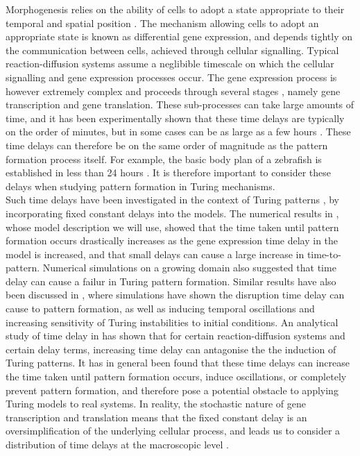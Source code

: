 \documentclass[12pt,a4paper]{report}
\begin{document}
Morphogenesis relies on the ability of cells to adopt a state appropriate to their temporal and spatial position \cite{gaffmonk}. The mechanism allowing cells to adopt an appropriate state is known as differential gene expression, and depends tightly on the communication between cells, achieved through cellular signalling. Typical reaction-diffusion systems assume a neglibible timescale on which the cellular signalling and gene expression processes occur. The gene expression process is however extremely complex and proceeds through several stages \cite{gaffmonk}, namely gene transcription and gene translation. These sub-processes can take large amounts of time, and it has been experimentally shown that these time delays are typically on the order of minutes, but in some cases can be as large as a few hours \cite{gaffmonk,tennyson}. These time delays can therefore be on the same order of magnitude as the pattern formation process itself. For example, the basic body plan of a zebrafish is established in less than 24 hours \cite{gaffmonk,kimmel}. It is therefore important to consider these delays when studying pattern formation in Turing mechanisms.
\\
Such time delays have been investigated in the context of Turing patterns \cite{gaffmonk,leegaffney,yigaffneyli,jiang,leegaffmonk,bratsun,william}, by incorporating fixed constant delays into the models. The numerical results in \cite{gaffmonk}, whose model description we will use, showed that the time taken until pattern formation occurs drastically increases as the gene expression time delay in the model is increased, and that small delays can cause a large increase in time-to-pattern. Numerical simulations on a growing domain also suggested that time delay can cause a failur in Turing pattern formation. Similar results have also been discussed in \cite{leegaffney,leegaffmonk}, where simulations have shown the disruption time delay can cause to pattern formation, as well as inducing temporal oscillations and increasing sensitivity of Turing instabilities to initial conditions. An analytical study of time delay in \cite{yigaffneyli} has shown that for certain reaction-diffusion systems and certain delay terms, increasing time delay can antagonise the the induction of Turing patterns. It has in general been found that these time delays can increase the time taken until pattern formation occurs, induce oscillations, or completely prevent pattern formation, and therefore pose a potential obstacle to applying Turing models to real systems. In reality, the stochastic nature of gene transcription and translation means that the fixed constant delay is an oversimplification of the underlying cellular process, and leads us to consider a distribution of time delays at the macroscopic level \cite{bratsun}.
\end{document}
